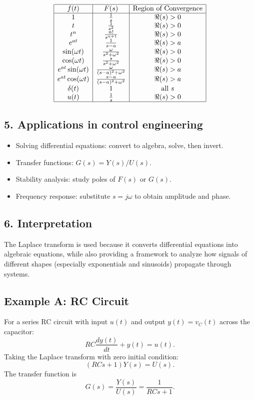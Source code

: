 \documentclass[12pt,a4paper]{article}
\begin{document}
	\[
	\begin{array}{|c|c|c|}
		\hline
		f(t) & F(s) & \text{Region of Convergence} \\
		\hline
		1 & \tfrac{1}{s} & \Re(s) > 0 \\
		t & \tfrac{1}{s^2} & \Re(s) > 0 \\
		t^n & \tfrac{n!}{s^{n+1}} & \Re(s) > 0 \\
		e^{at} & \tfrac{1}{s-a} & \Re(s) > a \\
		\sin(\omega t) & \tfrac{\omega}{s^2+\omega^2} & \Re(s) > 0 \\
		\cos(\omega t) & \tfrac{s}{s^2+\omega^2} & \Re(s) > 0 \\
		e^{at}\sin(\omega t) & \tfrac{\omega}{(s-a)^2+\omega^2} & \Re(s) > a \\
		e^{at}\cos(\omega t) & \tfrac{s-a}{(s-a)^2+\omega^2} & \Re(s) > a \\
		\delta(t) & 1 & \text{all $s$} \\
		u(t) & \tfrac{1}{s} & \Re(s) > 0 \\
		\hline
	\end{array}
	\]
	
	\subsection*{5. Applications in control engineering}
	\begin{itemize}
		\item Solving differential equations: convert to algebra, solve, then invert.
		\item Transfer functions: $G(s) = Y(s)/U(s)$.
		\item Stability analysis: study poles of $F(s)$ or $G(s)$.
		\item Frequency response: substitute $s = j\omega$ to obtain amplitude and phase.
	\end{itemize}
	
	\subsection*{6. Interpretation}
	The Laplace transform is used because it converts differential equations into algebraic equations, while also providing a framework to analyze how signals of different shapes (especially exponentials and sinusoids) propagate through systems.
	
	\bigskip
	
	\subsection*{Example A: RC Circuit}
	For a series RC circuit with input $u(t)$ and output $y(t) = v_C(t)$ across the capacitor:
	$$
	RC \frac{dy(t)}{dt} + y(t) = u(t).
	$$
	Taking the Laplace transform with zero initial condition:
	$$
	(RCs + 1) Y(s) = U(s).
	$$
	The transfer function is
	$$
	G(s) = \frac{Y(s)}{U(s)} = \frac{1}{RCs+1}.
	$$
	
\end{document}
